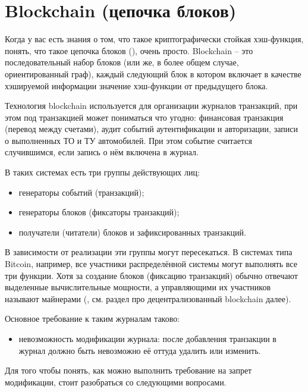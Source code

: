 \section{Blockchain (цепочка блоков)}\label{section-blockchain}

Когда у вас есть знания о том, что такое криптографически стойкая хэш-функция, понять, что такое цепочка блоков (), очень просто. Blockchain -- это последовательный набор блоков (или же, в более общем случае, ориентированный граф), каждый следующий блок в котором включает в качестве хэшируемой информации значение хэш-функции от предыдущего блока.

Технология blockchain используется для организации журналов транзакций, при этом под транзакцией может пониматься что угодно: финансовая транзакция (перевод между счетами), аудит событий аутентификации и авторизации, записи о выполненных ТО и ТУ автомобилей. При этом событие считается случившимся, если запись о нём включена в журнал.

В таких системах есть три группы действующих лиц:

\begin{itemize}
	\item генераторы событий (транзакций);
	\item генераторы блоков (фиксаторы транзакций);
	\item получатели (читатели) блоков и зафиксированных транзакций.
\end{itemize}

В зависимости от реализации эти группы могут пересекаться. В системах типа Bitcoin, например, все участники распределённой системы могут выполнять все три функции. Хотя за создание блоков (фиксацию транзакций) обычно отвечают выделенные вычислительные мощности, а управляющими их участников называют майнерами (, см. раздел про децентрализованный blockchain далее).

Основное требование к таким журналам таково:

\begin{itemize}
	\item невозможность модификации журнала: после добавления транзакции в журнал должно быть невозможно её оттуда удалить или изменить.
\end{itemize}

Для того чтобы понять, как можно выполнить требование на запрет модификации, стоит разобраться со следующими вопросами.

